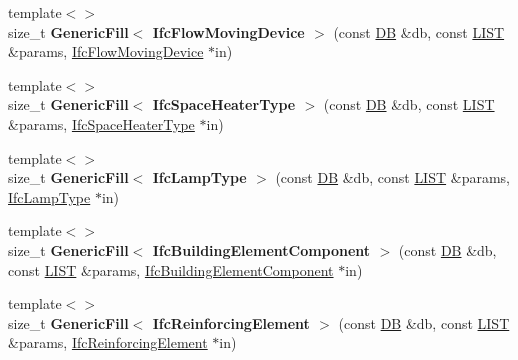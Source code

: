 \begin{DoxyCompactItemize}
\item 
\hypertarget{namespace_assimp_1_1_s_t_e_p_ae4cdbb0dc50f9544f6c13ed4d907d7e9}{{\footnotesize template$<$$>$ }\\size\+\_\+t {\bfseries Generic\+Fill$<$ Ifc\+Flow\+Moving\+Device $>$} (const \hyperlink{class_assimp_1_1_s_t_e_p_1_1_d_b}{D\+B} \&db, const \hyperlink{class_assimp_1_1_s_t_e_p_1_1_e_x_p_r_e_s_s_1_1_l_i_s_t}{L\+I\+S\+T} \&params, \hyperlink{struct_assimp_1_1_i_f_c_1_1_ifc_flow_moving_device}{Ifc\+Flow\+Moving\+Device} $\ast$in)}\label{namespace_assimp_1_1_s_t_e_p_ae4cdbb0dc50f9544f6c13ed4d907d7e9}

\item 
\hypertarget{namespace_assimp_1_1_s_t_e_p_a2c53f25ad0b73299ca91cc444ea2b101}{{\footnotesize template$<$$>$ }\\size\+\_\+t {\bfseries Generic\+Fill$<$ Ifc\+Space\+Heater\+Type $>$} (const \hyperlink{class_assimp_1_1_s_t_e_p_1_1_d_b}{D\+B} \&db, const \hyperlink{class_assimp_1_1_s_t_e_p_1_1_e_x_p_r_e_s_s_1_1_l_i_s_t}{L\+I\+S\+T} \&params, \hyperlink{struct_assimp_1_1_i_f_c_1_1_ifc_space_heater_type}{Ifc\+Space\+Heater\+Type} $\ast$in)}\label{namespace_assimp_1_1_s_t_e_p_a2c53f25ad0b73299ca91cc444ea2b101}

\item 
\hypertarget{namespace_assimp_1_1_s_t_e_p_ac202a32a629338ad9299920f96102c91}{{\footnotesize template$<$$>$ }\\size\+\_\+t {\bfseries Generic\+Fill$<$ Ifc\+Lamp\+Type $>$} (const \hyperlink{class_assimp_1_1_s_t_e_p_1_1_d_b}{D\+B} \&db, const \hyperlink{class_assimp_1_1_s_t_e_p_1_1_e_x_p_r_e_s_s_1_1_l_i_s_t}{L\+I\+S\+T} \&params, \hyperlink{struct_assimp_1_1_i_f_c_1_1_ifc_lamp_type}{Ifc\+Lamp\+Type} $\ast$in)}\label{namespace_assimp_1_1_s_t_e_p_ac202a32a629338ad9299920f96102c91}

\item 
\hypertarget{namespace_assimp_1_1_s_t_e_p_a2a3425093bc4b12d250347fa151b8a61}{{\footnotesize template$<$$>$ }\\size\+\_\+t {\bfseries Generic\+Fill$<$ Ifc\+Building\+Element\+Component $>$} (const \hyperlink{class_assimp_1_1_s_t_e_p_1_1_d_b}{D\+B} \&db, const \hyperlink{class_assimp_1_1_s_t_e_p_1_1_e_x_p_r_e_s_s_1_1_l_i_s_t}{L\+I\+S\+T} \&params, \hyperlink{struct_assimp_1_1_i_f_c_1_1_ifc_building_element_component}{Ifc\+Building\+Element\+Component} $\ast$in)}\label{namespace_assimp_1_1_s_t_e_p_a2a3425093bc4b12d250347fa151b8a61}

\item 
\hypertarget{namespace_assimp_1_1_s_t_e_p_aa7dce3c8c1dcd4cbf77dc830e1f26c47}{{\footnotesize template$<$$>$ }\\size\+\_\+t {\bfseries Generic\+Fill$<$ Ifc\+Reinforcing\+Element $>$} (const \hyperlink{class_assimp_1_1_s_t_e_p_1_1_d_b}{D\+B} \&db, const \hyperlink{class_assimp_1_1_s_t_e_p_1_1_e_x_p_r_e_s_s_1_1_l_i_s_t}{L\+I\+S\+T} \&params, \hyperlink{struct_assimp_1_1_i_f_c_1_1_ifc_reinforcing_element}{Ifc\+Reinforcing\+Element} $\ast$in)}\label{namespace_assimp_1_1_s_t_e_p_aa7dce3c8c1dcd4cbf77dc830e1f26c47}


\end{DoxyCompactItemize}
